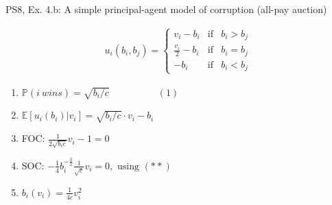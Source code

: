 \begin{frame}{PS8, Ex. 4.b: A simple principal-agent model of corruption (all-pay auction)}
\begin{multicols}{2}
\begin{align*}
        u_i(b_i,b_j)=\left\{\begin{array}{lcl}
          v_i-b_i           & \text{if} & b_i>b_j \\
          \frac{v_i}{2}-b_i & \text{if} & b_i=b_j \\
          -b_i              & \text{if} & b_i<b_j
        \end{array}\right.
      \end{align*} \vspace{-16pt}
      \begin{enumerate}
        \item $\mathbb{P}(i\ wins)=\sqrt{b_i/c}\quad\quad\quad\quad\quad(1)$
        \item $\mathbb{E}[u_i(b_i)|v_i]=\sqrt{b_i/c}\cdot v_i-b_i$
        \item FOC: $\frac{1}{2\sqrt{b_ic}}v_i-1=0$
        \item[] SOC: $-\frac{1}{4}b_i^{-\frac{3}{2}}\frac{1}{\sqrt{c}}v_i=0,\text{ using }(**)$
        \item $b_i(v_i)=\frac{1}{4c}v_i^2$
      \end{enumerate}
      \vfill\null
    \end{multicols}
\end{frame}
